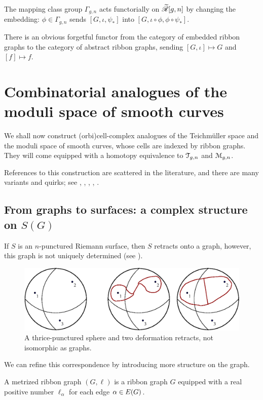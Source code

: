 The mapping class group $\Gamma_{g,n}$ acts functorially on $\mathscr{\widetilde R}[g,n]$ by
changing the embedding: $\phi \in \Gamma_{g,n}$ sends $[G, \iota, \psi_*]$ into $[G, \iota
\circ \phi, \phi \circ \psi_*]$.

There is an obvious forgetful functor from the category of embedded
ribbon graphs to the category of abstract ribbon graphs, sending $[G,
\iota] \mapsto G$ and $[f] \mapsto f$.



\section{Combinatorial analogues of the moduli space of smooth curves}
\label{sec:mgn-comb}

We shall now construct (orbi)cell-complex analogues of the Teichm\"uller
space and the moduli space of smooth curves, whose cells are indexed
by ribbon graphs.  They will come equipped with a homotopy
equivalence to $\mathcal{T}_{g,n}$ and $\mathcal{M}_{g,n}$.

References to this construction are scattered in the literature, and
there are many variants and quirks; see
\cite{harer;cohomology-of-moduli},
\cite{harer;cohomological-dimension},
\cite{kontsevich;intersection-theory;1992},
\cite{looijenga;cellular-decomposition},
\cite{penner:math.GT/0210326}.


\subsection{From graphs to surfaces: a complex structure on $S(G)$}
\label{sec:atlas}

If $S$ is an $n$-punctured Riemann surface, then $S$ retracts onto a
graph, however, this graph is not uniquely determined (see
).
\begin{figure}[bt]
  \centering\includegraphics[width=\textwidth]{sfera3}
  \caption{A thrice-punctured sphere and two deformation retracts, not
    isomorphic as graphs.}
  \label{fig:sphere-retracts}
\end{figure}
We can refine this correspondence by introducing more structure on the
graph.
\begin{definition}
  \label{dfn:metric-ribbon-graphs}
  A metrized ribbon graph $(G, \ell)$ is a ribbon graph $G$ equipped with
  a real positive number $\ell_\alpha$ for each edge $\alpha \in E(G)$.
\end{definition}

